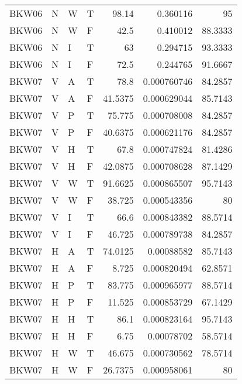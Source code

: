 \begin{longtable}{llllrrr}
    BKW06    & N     & W     & T          & 98.14      & 0.360116    & 95       \\
    BKW06    & N     & W     & F          & 42.5       & 0.410012    & 88.3333  \\
    BKW06    & N     & I     & T          & 63         & 0.294715    & 93.3333  \\
    BKW06    & N     & I     & F          & 72.5       & 0.244765    & 91.6667  \\
    BKW07    & V     & A     & T          & 78.8       & 0.000760746 & 84.2857  \\
    BKW07    & V     & A     & F          & 41.5375    & 0.000629044 & 85.7143  \\
    BKW07    & V     & P     & T          & 75.775     & 0.000708008 & 84.2857  \\
    BKW07    & V     & P     & F          & 40.6375    & 0.000621176 & 84.2857  \\
    BKW07    & V     & H     & T          & 67.8       & 0.000747824 & 81.4286  \\
    BKW07    & V     & H     & F          & 42.0875    & 0.000708628 & 87.1429  \\
    BKW07    & V     & W     & T          & 91.6625    & 0.000865507 & 95.7143  \\
    BKW07    & V     & W     & F          & 38.725     & 0.000543356 & 80       \\
    BKW07    & V     & I     & T          & 66.6       & 0.000843382 & 88.5714  \\
    BKW07    & V     & I     & F          & 46.725     & 0.000789738 & 84.2857  \\
    BKW07    & H     & A     & T          & 74.0125    & 0.00088582  & 85.7143  \\
    BKW07    & H     & A     & F          & 8.725      & 0.000820494 & 62.8571  \\
    BKW07    & H     & P     & T          & 83.775     & 0.000965977 & 88.5714  \\
    BKW07    & H     & P     & F          & 11.525     & 0.000853729 & 67.1429  \\
    BKW07    & H     & H     & T          & 86.1       & 0.000823164 & 95.7143  \\
    BKW07    & H     & H     & F          & 6.75       & 0.00078702  & 58.5714  \\
    BKW07    & H     & W     & T          & 46.675     & 0.000730562 & 78.5714  \\
    BKW07    & H     & W     & F          & 26.7375    & 0.000958061 & 80       \\

\end{longtable}
